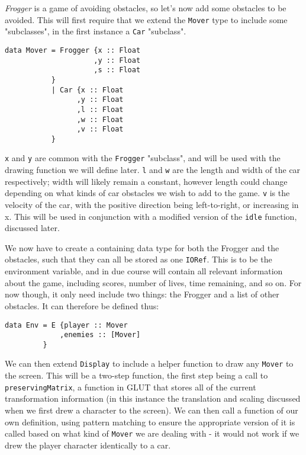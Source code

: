 \documentclass[12pt, a4paper]{report}
\begin{document}
\textit{Frogger} is a game of avoiding obstacles, so let's now add some obstacles to be avoided.
This will first require that we extend the \verb|Mover| type to include some "subclasses", in the first instance a \verb|Car| "subclass".

\begin{lstlisting}
data Mover = Frogger {x :: Float
                     ,y :: Float
                     ,s :: Float
           }
           | Car {x :: Float
                 ,y :: Float
                 ,l :: Float
                 ,w :: Float
                 ,v :: Float
           }
\end{lstlisting}

\verb|x| and \verb|y| are common with the \verb|Frogger| "subclass", and will be used with the drawing function we will define later.
\verb|l| and \verb|w| are the length and width of the car respectively; width will likely remain a constant, however length could change depending on what kinds of car obstacles we wish to add to the game.
\verb|v| is the velocity of the car, with the positive direction being left-to-right, or increasing in x.
This will be used in conjunction with a modified version of the \verb|idle| function, discussed later.


We now have to create a containing data type for both the Frogger and the obstacles, such that they can all be stored as one \verb|IORef|.
This is to be the environment variable, and in due course will contain all relevant information about the game, including scores, number of lives, time remaining, and so on.
For now though, it only need include two things: the Frogger and a list of other obstacles.
It can therefore be defined thus:

\begin{lstlisting}
data Env = E {player :: Mover
             ,enemies :: [Mover]
         }
\end{lstlisting}

We can then extend \verb|Display| to include a helper function to draw any \verb|Mover| to the screen.
This will be a two-step function, the first step being a call to \verb|preservingMatrix|, a function in GLUT that stores all of the current transformation information (in this instance the translation and scaling discussed when we first drew a character to the screen).
We can then call a function of our own definition, using pattern matching to ensure the appropriate version of it is called based on what kind of \verb|Mover| we are dealing with - it would not work if we drew the player character identically to a car.
\end{document}
